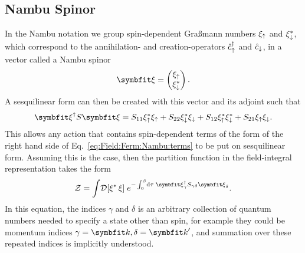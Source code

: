 \subsection{Nambu Spinor}

In the Nambu notation we group spin-dependent Gra\ss mann numbers $\xi_\uparrow$ and $\xi_\downarrow^\ast$, which correspond to the
annihilation- and creation-operators $\hat{c}_\uparrow^\dagger$ and $\hat{c}_\downarrow$, in a vector called a Nambu spinor
\begin{equation}
    \label{eq:Field:Ferm:Nambu:vector}
    \v{\xi} = 
    \begin{pmatrix}
        \xi_\up\\
        \xi_\dn^\ast
    \end{pmatrix}.
\end{equation}
A sesquilinear form can then be created with this vector and its adjoint such that
\begin{equation}
    \label{eq:Field:Ferm:Nambu:terms}
    \v{\xi}^\dagger S\v{\xi} = S_{11}\xi_\up^\ast\xi_\up + S_{22}\xi_\dn^\ast\xi_\dn + S_{12}\xi_\up^\ast\xi_\dn^\ast + S_{21}\xi_\up\xi_\dn.
\end{equation}
This allows any action that contains spin-dependent terms of the form of the right hand side of Eq.~\eqref{eq:Field:Ferm:Nambu:terms} to
be put on sesquilinear form. Assuming this is the case, then the partition function in the field-integral representation takes the form
\begin{equation}
    \label{eq:Field:Ferm:Nambu:partitionFunction}
    \mathcal{Z} = \int\!\mathcal{D}[\xi^\ast\,\xi]\;e^{-\int_0^\beta\!\mathrm{d}\tau\;\v{\xi}^\dagger_\gamma S_{\gamma\delta}\v{\xi}_\delta}.
\end{equation}
In this equation, the indices $\gamma$ and $\delta$ is an arbitrary collection of quantum numbers needed to specify a state other than spin,
for example they could be momentum indices $\gamma = \v{k}, \delta = \v{k}'$, and summation over these repeated indices is implicitly understood.

